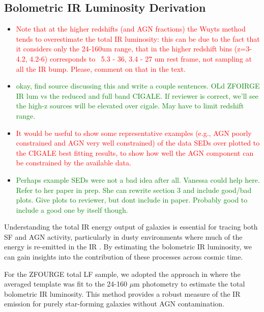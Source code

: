 \subsection{Bolometric IR Luminosity Derivation} \label{Sec: IR_Luminosity}
\begin{itemize}
    \item \textcolor{red}{Note that at the higher redshifts (and AGN fractions) the Wuyts method tends to overestimate the total IR luminosity: this can be due to the fact that it considers only the 24-160um range, that in the higher redshift bins (z=3-4.2, 4.2-6) corresponds to ~5.3 - 36, 3.4 - 27 um rest frame, not sampling at all the IR bump. Please, comment on that in the text.}
    \item \textcolor{Green}{okay, find source discussing this and write a couple sentences. OLd ZFOIRGE IR lum vs the reduced and full band CIGALE. If reviewer is correct, we'll see the high-z sources will be elevated over cigale. May have to limit redshift range.}
    \vspace{0.25cm}
    
    \item \textcolor{red}{It would be useful to show some representative examples (e.g., AGN poorly constrained and AGN very well constrained) of the data SEDs over plotted to the CIGALE best fitting results, to show how well the AGN component can be constrained by the available data.}
    \item \textcolor{Green}{Perhaps example SEDs were not a bad idea after all. Vanessa could help here. Refer to her paper in prep. She can rewrite section 3 and include good/bad plots. Give plots to reviewer, but dont include in paper. Probably good to include a good one by itself though.}   
\end{itemize}

Understanding the total IR energy output of galaxies is essential for tracing both SF and AGN activity, particularly in dusty environments where much of the energy is re-emitted in the IR \citep{fu_decomposing_2010}. By estimating the bolometric IR luminosity, we can gain insights into the contribution of these processes across cosmic time. 

For the ZFOURGE total LF sample, we adopted the approach in \cite{straatman_fourstar_2016} where the averaged \cite{wuyts_fireworks_2008} template was fit to the 24-160 $\mu$m photometry to estimate the total bolometric IR luminosity. This method provides a robust measure of the IR emission for purely star-forming galaxies without AGN contamination.

